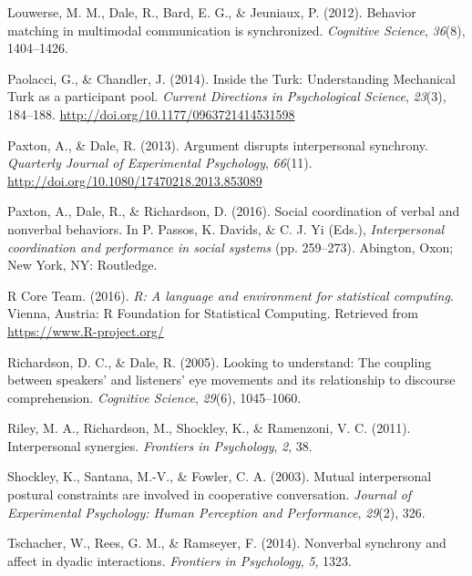 \documentclass[10pt, letterpaper]{article}
\begin{document}
\hypertarget{ref-louwerse2012behavior}{}
Louwerse, M. M., Dale, R., Bard, E. G., \& Jeuniaux, P. (2012). Behavior
matching in multimodal communication is synchronized. \emph{Cognitive
Science}, \emph{36}(8), 1404--1426.

\hypertarget{ref-paolacci2014inside}{}
Paolacci, G., \& Chandler, J. (2014). Inside the Turk: Understanding
Mechanical Turk as a participant pool. \emph{Current Directions in
Psychological Science}, \emph{23}(3), 184--188.
\url{http://doi.org/10.1177/0963721414531598}

\hypertarget{ref-paxton2013argument}{}
Paxton, A., \& Dale, R. (2013). Argument disrupts interpersonal
synchrony. \emph{Quarterly Journal of Experimental Psychology},
\emph{66}(11). \url{http://doi.org/10.1080/17470218.2013.853089}

\hypertarget{ref-paxton2016social}{}
Paxton, A., Dale, R., \& Richardson, D. (2016). Social coordination of
verbal and nonverbal behaviors. In P. Passos, K. Davids, \& C. J. Yi
(Eds.), \emph{Interpersonal coordination and performance in social
systems} (pp. 259--273). Abington, Oxon; New York, NY: Routledge.

\hypertarget{ref-r2016r}{}
R Core Team. (2016). \emph{R: A language and environment for statistical
computing}. Vienna, Austria: R Foundation for Statistical Computing.
Retrieved from \url{https://www.R-project.org/}

\hypertarget{ref-richardson2005looking}{}
Richardson, D. C., \& Dale, R. (2005). Looking to understand: The
coupling between speakers' and listeners' eye movements and its
relationship to discourse comprehension. \emph{Cognitive Science},
\emph{29}(6), 1045--1060.

\hypertarget{ref-riley2011interpersonal}{}
Riley, M. A., Richardson, M., Shockley, K., \& Ramenzoni, V. C. (2011).
Interpersonal synergies. \emph{Frontiers in Psychology}, \emph{2}, 38.

\hypertarget{ref-shockley2003mutual}{}
Shockley, K., Santana, M.-V., \& Fowler, C. A. (2003). Mutual
interpersonal postural constraints are involved in cooperative
conversation. \emph{Journal of Experimental Psychology: Human Perception
and Performance}, \emph{29}(2), 326.

\hypertarget{ref-tschacher2014nonverbal}{}
Tschacher, W., Rees, G. M., \& Ramseyer, F. (2014). Nonverbal synchrony
and affect in dyadic interactions. \emph{Frontiers in Psychology},
\emph{5}, 1323.
\end{document}
